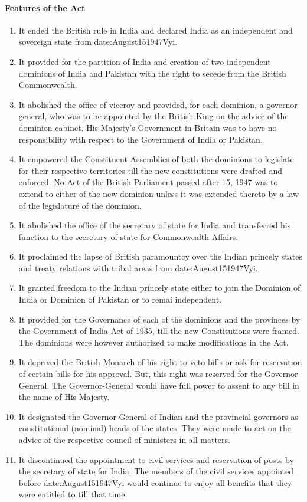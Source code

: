 \paragraph{Features of the Act}
\begin{enumerate}
  \item It ended the British rule in India and declared India as an independent and sovereign state from \gls{date:August151947Vyi}.
  \item It provided for the partition of India and creation of two independent dominions of India and Pakistan with the right to secede from the British Commonwealth.
  \item It abolished the office of viceroy and provided, for each dominion, a governor-general, who was to be appointed by the British King on the advice of the dominion cabinet. His Majesty's Government in Britain was to have no responsibility with respect to the Government of India or Pakistan.
  \item It empowered the Constituent Assemblies of both the dominions to legislate for their respective territories till the new constitutions were drafted and enforced. No Act of the British Parliament passed after 15, 1947 was to extend to either of the new dominion unless it was extended thereto by a law of the legislature of the dominion.
  \item It abolished the office of the secretary of state for India and transferred his function to the secretary of state for Commonwealth Affairs.
  \item It proclaimed the lapse of British paramountcy over the Indian princely states and treaty relations with tribal areas from \gls{date:August151947Vyi}.
  \item It granted freedom to the Indian princely state either to join the Dominion of India or Dominion of Pakistan or to remai independent.
  \item It provided for the Governance of each of the dominions and the provinces by the Government of India Act of 1935, till the new Constitutions were framed. The dominions were however authorized to make modifications in the Act.
  \item It deprived the British Monarch of his right to veto bills or ask for reservation of certain bills for his approval. But, this right was reserved for the Governor-General. The Governor-General would have full power to assent to any bill in the name of His Majesty.
  \item It designated the Governor-General of Indian and the provincial governors as constitutional (nominal) heads of the states. They were made to act on the advice of the respective council of ministers in all matters.
  \item It discontinued the appointment to civil services and reservation of posts by the secretary of state for India. The members of the civil services appointed before \gls{date:August151947Vyi} would continue to enjoy all benefits that they were entitled to till that time.
\end{enumerate}

